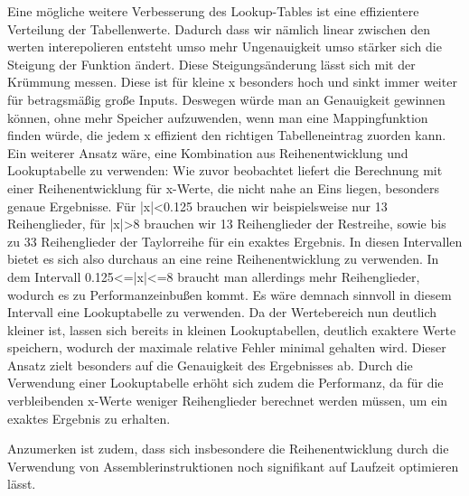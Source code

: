 \documentclass[course=erap] {aspdoc}
\begin{document}
     Eine mögliche weitere Verbesserung des Lookup-Tables ist eine effizientere Verteilung der Tabellenwerte. Dadurch dass wir nämlich linear zwischen den 
     werten interepolieren entsteht umso mehr Ungenauigkeit umso stärker sich die Steigung der Funktion ändert. Diese Steigungsänderung lässt sich mit der Krümmung messen.
     Diese ist für kleine x besonders hoch und sinkt immer weiter für betragsmäßig große Inputs. Deswegen würde man an Genauigkeit gewinnen können, ohne mehr 
     Speicher aufzuwenden, wenn man eine Mappingfunktion finden würde, die jedem x effizient den richtigen Tabelleneintrag zuorden kann.
      Ein weiterer Ansatz wäre, eine Kombination aus Reihenentwicklung und Lookuptabelle zu verwenden: 
     Wie zuvor beobachtet liefert die Berechnung mit einer Reihenentwicklung für x-Werte, die nicht nahe an Eins liegen, besonders genaue Ergebnisse. Für |x|<0.125 brauchen wir beispielsweise nur 13 Reihenglieder, für |x|>8 brauchen wir 13 Reihenglieder der Restreihe, sowie bis zu 33 Reihenglieder der Taylorreihe für ein exaktes Ergebnis. In diesen Intervallen bietet es sich also durchaus an eine reine Reihenentwicklung zu verwenden. In dem Intervall 0.125<=|x|<=8 braucht man allerdings mehr Reihenglieder, wodurch es zu Performanzeinbußen kommt. Es wäre demnach sinnvoll in diesem Intervall eine Lookuptabelle zu verwenden. Da der Wertebereich nun deutlich kleiner ist, lassen sich bereits in kleinen Lookuptabellen, deutlich exaktere Werte speichern, wodurch der maximale relative Fehler minimal gehalten wird. Dieser Ansatz zielt besonders auf die Genauigkeit des Ergebnisses ab. Durch die Verwendung einer Lookuptabelle erhöht sich zudem die Performanz, da für die verbleibenden x-Werte weniger Reihenglieder berechnet werden müssen, um ein exaktes Ergebnis zu erhalten. 
 
     Anzumerken ist zudem, dass sich insbesondere die Reihenentwicklung durch die Verwendung von Assemblerinstruktionen noch signifikant auf Laufzeit optimieren lässt. 
 
     
     
 
 
\end{document}
